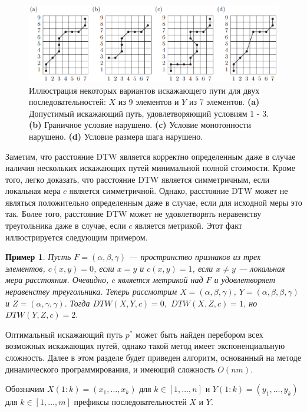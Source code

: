 \documentclass[a4paper, 14pt]{extarticle}
\numberwithin{figure}{subsection}
\numberwithin{equation}{subsection}
\newtheorem{example}{Пример}[subsection]
\begin{document}
\begin{figure}[h]
\centering
\includegraphics[width=15cm]{p4.png}
\caption{Иллюстрация некоторых вариантов искажающего пути для двух последовательностей: $X$ из 9 элементов и $Y$ из 7 элементов. {\bf (a)} Допустимый искажающий путь, удовлетворяющий условиям 1 - 3. {\bf (b)} Граничное условие нарушено. {\bf (c)} Условие монотонности нарушено. {\bf (d)} Условие размера шага нарушено.}
\label{fig:p4}
\end{figure}

Заметим, что расстояние DTW является корректно определенным даже в случае наличия нескольких искажающих путей минимальной полной стоимости. Кроме того, легко доказать, что расстояние DTW является симметричным, если локальная мера $c$ является симметричной. Однако, расстояние DTW может не являться положительно определенным даже в случае, если для исходной меры это так. Более того, расстояние DTW может не удовлетворять неравенству треугольника даже в случае, если $c$ является метрикой. Этот факт иллюстрируется следующим примером.

\begin{example}
	Пусть $F=(\alpha, \beta, \gamma)$ --- пространство признаков из трех элементов, $c(x, y) = 0$, если $x = y$ и $c(x, y) = 1$, если $x \ne y$ --- локальная мера расстояния. Очевидно, $c$ является метрикой над $F$ и удовлетворяет неравенству треугольника. Теперь рассмотрим $X=(\alpha,\beta,\gamma)$, $Y=(\alpha,\beta,\beta,\gamma)$ и $Z=(\alpha,\gamma,\gamma).$ Тогда $DTW(X,Y,c) = 0,$ $DTW(X, Z, c) = 1$, но $DTW(Y,Z, c) = 2.$
\end{example}

Оптимальный искажающий путь $p^*$ может быть найден перебором всех возможных искажающих путей, однако такой метод имеет экспоненциальную сложность. Далее в этом разделе будет приведен алгоритм, основанный на методе динамического программирования, и имеющий сложность $O(nm)$.

Обозначим $X(1:k)=(x_1, \dots, x_k)$ для $k \in [1, \dots, n]$ и $Y(1:k)=(y_1, \dots, y_k)$ для $k \in [1, \dots, m]$ префиксы последовательностей $X$ и $Y$.
\end{document}
